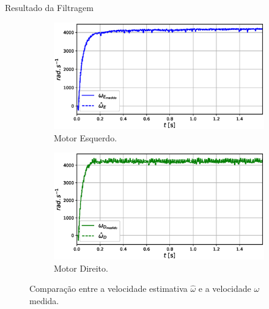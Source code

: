 \begin{frame}{Resultado da Filtragem}

    \begin{figure}
        \begin{subfigure}{.45\textwidth}
            \centering
            \includegraphics[width=\textwidth]{figuras/resultados/exp03/filtro_vs_sem_filtro_esquerdo100.eps}
            \caption{Motor Esquerdo.}
        \end{subfigure}
        \begin{subfigure}{.45\textwidth}
            \centering
            \includegraphics[width=\textwidth]{figuras/resultados/exp03/filtro_vs_sem_filtro_direito100.eps}
            \caption{Motor Direito.}
        \end{subfigure}
        \caption{Comparação entre a velocidade estimativa $\hat{\omega}$ e a velocidade $\omega$ medida.}
    \end{figure}
    
\end{frame}

